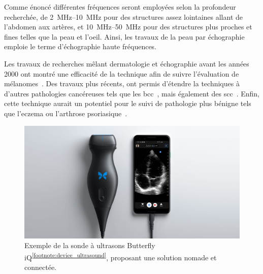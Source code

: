Comme énoncé différentes fréquences seront employées selon la profondeur recherchée, de  \SIrange{2}{10}{\mega\hertz} pour des structures assez lointaines allant de l'abdomen aux artères, et \SIrange{10}{50}{\mega\hertz} pour des structures plus proches et fines telles que la peau et l'oeil. Ainsi, les travaux de la peau par échographie emploie le terme d'échographie haute fréquences.\par

Les travaux de recherches mêlant dermatologie et échographie avant les années 2000 ont montré une efficacité de la technique afin de suivre l'évaluation de mélanomes~\cite{Cammarota1998}. Des travaux plus récents, ont permis d'étendre la techniques à d'autres pathologies cancéreuses tels que les \gls{bcc}~\cite{Barcaui2014}, mais également des \gls{scc}~\cite{Catalano2010}. Enfin, cette technique aurait un potentiel pour le suivi de pathologie plus bénigne tels que l'eczema ou l'arthrose psoriasique~\cite{Bhatta2018}.\par

\begin{figure}[H]
    \centering
    \includegraphics[width=\linewidth]{contents/chapter_2/resources/exemple_ultrasound.jpg}
    \caption{Exemple de la sonde à ultrasons Butterfly iQ\textsuperscript{\ref{footnote:device_ultrasound}}, proposant une solution nomade et connectée.}
    \label{fig:exemple_ultrasound}
\end{figure}\par


\addtocounter{footnote}{1}

\clearpage

